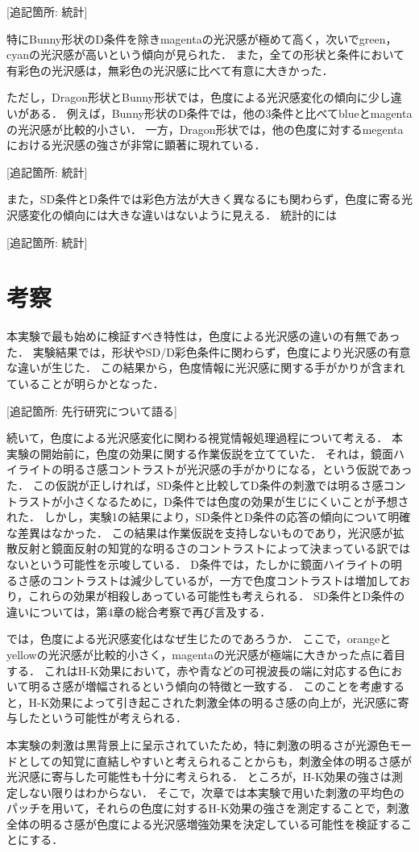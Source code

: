            [追記箇所: 統計]

            特にBunny形状のD条件を除きmagentaの光沢感が極めて高く，次いでgreen，cyanの光沢感が高いという傾向が見られた．
            また，全ての形状と条件において有彩色の光沢感は，無彩色の光沢感に比べて有意に大きかった．


            ただし，Dragon形状とBunny形状では，色度による光沢感変化の傾向に少し違いがある．
            例えば，Bunny形状のD条件では，他の3条件と比べてblueとmagentaの光沢感が比較的小さい．
            一方，Dragon形状では，他の色度に対するmegentaにおける光沢感の強さが非常に顕著に現れている．

            [追記箇所: 統計]

            また，SD条件とD条件では彩色方法が大きく異なるにも関わらず，色度に寄る光沢感変化の傾向には大きな違いはないように見える．
            統計的には

            [追記箇所: 統計]


    \section{考察}
        本実験で最も始めに検証すべき特性は，色度による光沢感の違いの有無であった．
        実験結果では，形状やSD/D彩色条件に関わらず，色度により光沢感の有意な違いが生じた．
        この結果から，色度情報に光沢感に関する手がかりが含まれていることが明らかとなった．

        [追記箇所: 先行研究について語る]

        続いて，色度による光沢感変化に関わる視覚情報処理過程について考える．
        本実験の開始前に，色度の効果に関する作業仮説を立てていた．
        それは，鏡面ハイライトの明るさ感コントラストが光沢感の手がかりになる，という仮説であった．
        この仮説が正しければ，SD条件と比較してD条件の刺激では明るさ感コントラストが小さくなるために，D条件では色度の効果が生じにくいことが予想された．
        しかし，実験1の結果により，SD条件とD条件の応答の傾向について明確な差異はなかった．
        この結果は作業仮説を支持しないものであり，光沢感が拡散反射と鏡面反射の知覚的な明るさのコントラストによって決まっている訳ではないという可能性を示唆している．
        D条件では，たしかに鏡面ハイライトの明るさ感のコントラストは減少しているが，一方で色度コントラストは増加しており，これらの効果が相殺しあっている可能性も考えられる．
        SD条件とD条件の違いについては，第4章の総合考察で再び言及する．

        では，色度による光沢感変化はなぜ生じたのであろうか．
        ここで，orangeとyellowの光沢感が比較的小さく，magentaの光沢感が極端に大きかった点に着目する．
        これはH-K効果において，赤や青などの可視波長の端に対応する色において明るさ感が増幅されるという傾向\cite{HKeffect}の特徴と一致する．
        このことを考慮すると，H-K効果によって引き起こされた刺激全体の明るさ感の向上が，光沢感に寄与したという可能性が考えられる．

        本実験の刺激は黒背景上に呈示されていたため，特に刺激の明るさが光源色モード\cite{LightMode}としての知覚に直結しやすいと考えられることからも，刺激全体の明るさ感が光沢感に寄与した可能性も十分に考えられる．
        ところが，H-K効果の強さは測定しない限りはわからない．
        そこで，次章では本実験で用いた刺激の平均色のパッチを用いて，それらの色度に対するH-K効果の強さを測定することで，刺激全体の明るさ感が色度による光沢感増強効果を決定している可能性を検証することにする．

    \newpage